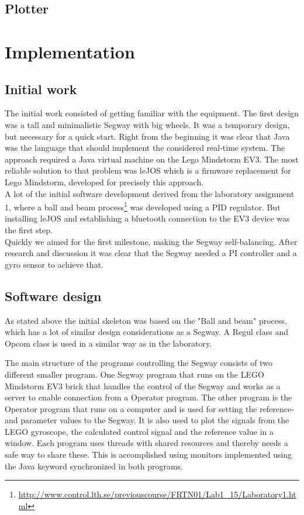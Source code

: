 \subsection{Plotter}
  
\section{Implementation}
\subsection{Initial work}
The initial work consisted of getting familiar with the equipment. The first design was a tall and minimalistic Segway with big wheels. It was a temporary design, but necessary for a quick start. Right from the beginning it was clear that Java was the language that should implement the considered real-time system. The approach required a Java virtual machine on the Lego Mindstorm EV3. The most reliable solution to that problem was leJOS which is a firmware replacement for Lego Mindstorm, developed for precisely this approach. 
\\[3ex]
A lot of the initial software development derived from the laboratory assignment 1, where a ball and beam process\footnote{\url{http://www.control.lth.se/previouscourse/FRTN01/Lab1_15/Laboratory1.html}} was developed using a PID regulator. But installing leJOS and establishing a bluetooth connection to the EV3 device was the first step. 
\\[3ex]
Quickly we aimed for the first milestone, making the Segway self-balancing. After research and discussion it was clear that the Segway needed a PI controller and a gyro sensor to achieve that. 

\subsection{Software design}

As stated above the initial skeleton was based on the "Ball and beam" process, which has a lot of similar design considerations as a Segway. A Regul class and Opcom class is used in a similar way as in the laboratory.

The main structure of the programs controlling the Segway consists of two different smaller program. One Segway program that runs on the LEGO Mindstorm EV3 brick that handles the control of the Segway and works as a server to enable connection from a Operator program. The other program is the Operator program that runs on a computer and is used for setting the reference- and parameter values to the Segway. It is also used to plot the signals from the LEGO gyroscope, the calculated control signal and the reference value in a window. Each program uses threads with shared resources and thereby needs a safe way to share these. This is accomplished using monitors implemented using the Java keyword synchronized in both programs.


